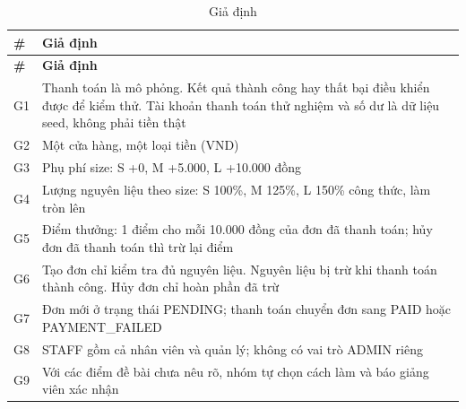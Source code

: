 {\small
\begin{longtable}{@{}L{1cm}L{12.9cm}@{}}
\caption{Giả định}\label{tab:giadinh}\\
\toprule
\textbf{\#} & \textbf{Giả định} \\ \midrule \endfirsthead
\toprule \textbf{\#} & \textbf{Giả định} \\ \midrule \endhead
\bottomrule \endfoot
G1 & Thanh toán là mô phỏng. Kết quả thành công hay thất bại điều khiển được để kiểm thử. Tài khoản thanh toán thử nghiệm và số dư là dữ liệu seed, không phải tiền thật \\
G2 & Một cửa hàng, một loại tiền (VND) \\
G3 & Phụ phí size: S +0, M +5.000, L +10.000 đồng \\
G4 & Lượng nguyên liệu theo size: S 100\%, M 125\%, L 150\% công thức, làm tròn lên \\
G5 & Điểm thưởng: 1 điểm cho mỗi 10.000 đồng của đơn đã thanh toán; hủy đơn đã thanh toán thì trừ lại điểm \\
G6 & Tạo đơn chỉ kiểm tra đủ nguyên liệu. Nguyên liệu bị trừ khi thanh toán thành công. Hủy đơn chỉ hoàn phần đã trừ \\
G7 & Đơn mới ở trạng thái PENDING; thanh toán chuyển đơn sang PAID hoặc PAYMENT\_FAILED \\
G8 & STAFF gồm cả nhân viên và quản lý; không có vai trò ADMIN riêng \\
G9 & Với các điểm đề bài chưa nêu rõ, nhóm tự chọn cách làm và báo giảng viên xác nhận \\
\end{longtable}
}